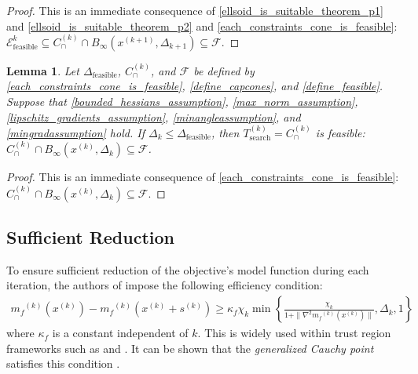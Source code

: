 \documentclass{article}
\newtheorem{lemma}[theorem]{Lemma}
\theoremstyle{case}
\numberwithin{theorem}{subsection}
\newcommand{\capcones}{{C^{(k)}_{\cap}}}
\newcommand{\dfeas}{{\Delta_{\textrm{feasible}}}}
\newcommand{\dk}{\Delta_k}
\newcommand{\dkpo}{\Delta_{k+1}}
\newcommand{\feasible}{{\mathcal F}}
\newcommand{\mfk}{{{m}_f}^{(k)}}
\newcommand{\naturals}{\mathbb N}
\newcommand{\searchtrk}{{T_{\text{search}}^{(k)}}}
\newcommand{\sk}{{{s}^{(k)}}}
\newcommand{\tr}{{ B_{\infty}\left(\xk, \dk\right) }}
\newcommand{\trkpo}{{ B_{\infty}\left(\xkpo, \dkpo\right) }}
\newcommand{\unshiftedellipsoid}{{\mathcal E^k_{\textrm{feasible}}}}
\newcommand{\xkpo}{{{x}^{(k+1)}}}
\newcommand{\xk}{x^{(k)}}
\begin{document}
\begin{proof}
This is an immediate consequence of \cref{ellsoid_is_suitable_theorem_p1} and \cref{ellsoid_is_suitable_theorem_p2} and \cref{each_constraints_cone_is_feasible}:
$\unshiftedellipsoid \subseteq \capcones \cap \trkpo \subseteq \feasible$.
\end{proof}



\begin{lemma}
\label{searchtrk_is_feasible}
Let $\dfeas$, $\capcones$, and $\feasible$
be defined by
\cref{each_constraints_cone_is_feasible},
\cref{define_capcones},
and
\cref{define_feasible}.
Suppose that 
\cref{bounded_hessians_assumption},
\cref{max_norm_assumption},
\cref{lipschitz_gradients_assumption},
\cref{minangleassumption},
and \cref{mingradassumption} hold.
If $\dk \le \dfeas$, then $\searchtrk = \capcones$ is feasible:
$\capcones \cap \tr \subseteq \feasible$.
\end{lemma}

\begin{proof}
This is an immediate consequence of \cref{each_constraints_cone_is_feasible}:
$\capcones \cap \tr \subseteq \feasible$.
\end{proof}






\subsection{Sufficient Reduction}
\label{sufficient_reduction_section}

To ensure sufficient reduction of the objective's model function during each iteration, the authors of \cite{Conejo:2013:GCT:2620806.2621814} impose the following efficiency condition:
\begin{align}
\label{efficiency}
\mfk\left(\xk\right) - \mfk\left(\xk + \sk\right) \ge \kappa_f \chi_k \min\left\{ \frac{\chi_k}{1+\|\nabla^2 \mfk(\xk)\|}, \dk, 1 \right\}
\end{align}
where $\kappa_f$ is a constant independent of $k$.
This is widely used within trust region frameworks such as \cite{Conejo:2013:GCT:2620806.2621814} and \cite{Conn:2000:TM:357813}.
It can be shown that the \emph{generalized Cauchy point} satisfies this condition \cite{Conn:2000:TM:357813}.
\end{document}
